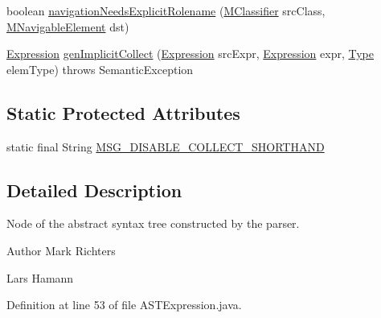 \begin{DoxyCompactItemize}
\item 
boolean \hyperlink{classorg_1_1tzi_1_1use_1_1parser_1_1ocl_1_1_a_s_t_expression_a6f3c442d210a6c074e7ed092c4751e34}{navigation\-Needs\-Explicit\-Rolename} (\hyperlink{interfaceorg_1_1tzi_1_1use_1_1uml_1_1mm_1_1_m_classifier}{M\-Classifier} src\-Class, \hyperlink{interfaceorg_1_1tzi_1_1use_1_1uml_1_1mm_1_1_m_navigable_element}{M\-Navigable\-Element} dst)
\item 
\hyperlink{classorg_1_1tzi_1_1use_1_1uml_1_1ocl_1_1expr_1_1_expression}{Expression} \hyperlink{classorg_1_1tzi_1_1use_1_1parser_1_1ocl_1_1_a_s_t_expression_a1ff5aaffb83109fc813a116b90a3976c}{gen\-Implicit\-Collect} (\hyperlink{classorg_1_1tzi_1_1use_1_1uml_1_1ocl_1_1expr_1_1_expression}{Expression} src\-Expr, \hyperlink{classorg_1_1tzi_1_1use_1_1uml_1_1ocl_1_1expr_1_1_expression}{Expression} expr, \hyperlink{interfaceorg_1_1tzi_1_1use_1_1uml_1_1ocl_1_1type_1_1_type}{Type} elem\-Type)  throws Semantic\-Exception      
\end{DoxyCompactItemize}
\subsection*{Static Protected Attributes}
\begin{DoxyCompactItemize}
\item 
static final String \hyperlink{classorg_1_1tzi_1_1use_1_1parser_1_1ocl_1_1_a_s_t_expression_a36641e96f36f61b0c658002ba01b3aaa}{M\-S\-G\-\_\-\-D\-I\-S\-A\-B\-L\-E\-\_\-\-C\-O\-L\-L\-E\-C\-T\-\_\-\-S\-H\-O\-R\-T\-H\-A\-N\-D}
\end{DoxyCompactItemize}


\subsection{Detailed Description}
Node of the abstract syntax tree constructed by the parser.

\begin{DoxyAuthor}{Author}
Mark Richters 

Lars Hamann 
\end{DoxyAuthor}


Definition at line 53 of file A\-S\-T\-Expression.\-java.




